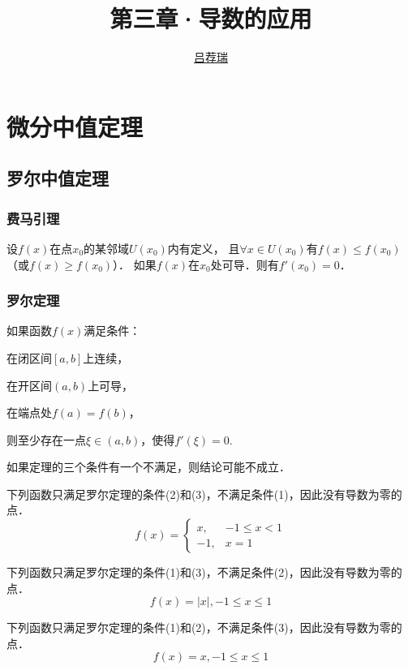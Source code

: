 \documentclass[14pt,notheorems,leqno,xcolor={rgb}]{beamer} %
\begin{document}
\title{第三章·导数的应用}
\author{\href{https://lvjr.bitbucket.io}{吕荐瑞}}

\begin{frame}[plain]
\titlepage
\end{frame}

\section{微分中值定理}

\subsection{罗尔中值定理}

\begin{iframe}
\frametitle{费马引理}
\quad
设$f(x)$在点$x_0$的某邻域$U(x_0)$内有定义，
且$\forall x\in U(x_0)$有$f(x)\le f(x_0)$（或$f(x)\ge f(x_0)$）．
如果$f(x)$在$x_0$处可导．则有$f'(x_0)=0$．
\end{iframe}

\begin{frame}
\frametitle{罗尔定理}
\begin{theorem}
如果函数$f(x)$满足条件：
\begin{enumskip}
\item 在闭区间$[a,b]$上连续，
\item 在开区间$(a,b)$上可导，
\item 在端点处$f(a)=f(b)$，
\end{enumskip}
则至少存在一点$\xi\in(a,b)$，使得$f'(\xi)=0$.
\end{theorem}
\vpause
\begin{fact}
如果定理的三个条件有一个不满足，则结论可能不成立．
\end{fact}
\end{frame}

\begin{frame}
\begin{example}
下列函数只满足罗尔定理的条件(2)和(3)，不满足条件(1)，因此没有导数为零的点．
\[f(x)=\begin{cases}x,&-1\leq x<1 \\
-1, &x=1\end{cases}\]
\end{example}
\end{frame}

\begin{frame}
\begin{example}
下列函数只满足罗尔定理的条件(1)和(3)，不满足条件(2)，因此没有导数为零的点．
\[f(x)=|x|, -1\leq x\leq 1\]
\end{example}
\vpause
\begin{example}
下列函数只满足罗尔定理的条件(1)和(2)，不满足条件(3)，因此没有导数为零的点．
\[f(x)=x, -1\leq x\leq 1\]
\end{example}
\end{frame}
\end{document}
